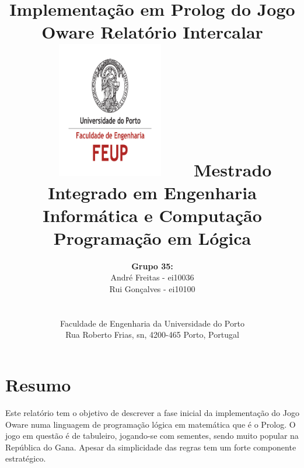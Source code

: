 \documentclass[15pt,a4paper]{article}
\begin{document}
\setlength{\textwidth}{16cm}
\setlength{\textheight}{22cm}

\title{\Huge\textbf{Implementação em Prolog do Jogo Oware}\linebreak\linebreak\linebreak
\Large\textbf{Relatório Intercalar}\linebreak\linebreak
\includegraphics[height=6cm, width=7cm]{feup.pdf}\linebreak \linebreak
\Large{Mestrado Integrado em Engenharia Informática e Computação} \linebreak \linebreak
\Large{Programação em Lógica}\linebreak
}

\author{\textbf{Grupo 35:}\\ André Freitas - ei10036 \\ Rui Gonçalves - ei10100 \\\linebreak\linebreak \\
 \\ Faculdade de Engenharia da Universidade do Porto \\ Rua Roberto Frias, s\/n, 4200-465 Porto, Portugal \linebreak\linebreak\linebreak
\linebreak\linebreak\vspace{1cm}}
\maketitle
\thispagestyle{empty}
\newpage
\section*{Resumo}
Este relatório tem o objetivo de descrever a fase inicial da implementação do Jogo Oware numa linguagem de programação lógica em matemática que é o Prolog. O jogo em questão é de tabuleiro, jogando-se com sementes, sendo muito popular na República do Gana. Apesar da simplicidade das regras tem um forte componente estratégico.
\end{document}
